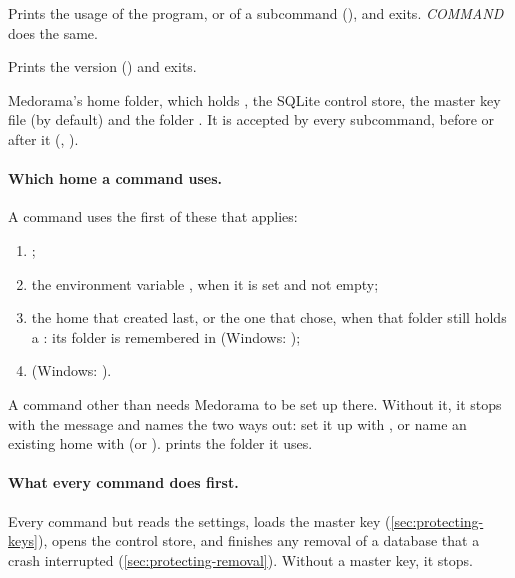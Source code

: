 \begin{params}
\item[-h, --help] Prints the usage of the program, or of a subcommand
  (), and exits.  \textit{COMMAND}
  does the same.
\item[-V, --version] Prints the version () and exits.
\item[--home DIR] Medorama's home folder, which holds , the SQLite control
  store, the master key file (by default) and the folder . It is accepted by every
  subcommand, before or after it (,
  ).
\end{params}

\paragraph{Which home a command uses.} A command uses the first of these that applies:
\begin{enumerate}
\item {};
\item the environment variable , when it is set and not empty;
\item the home that  created last, or the one that 
  chose, when that folder still holds a : its folder is remembered in
   (Windows: );
\item {} (Windows: ).
\end{enumerate}
A command other than  needs Medorama to be set up there. Without it, it stops with the
message  and names the two ways out: set it up with
, or name an existing home with  (or
).  prints the folder it uses.

\paragraph{What every command does first.} Every command but  reads the settings,
loads the master key (\cref{sec:protecting-keys}), opens the control store, and finishes any
removal of a database that a crash interrupted (\cref{sec:protecting-removal}). Without a master
key, it stops.

